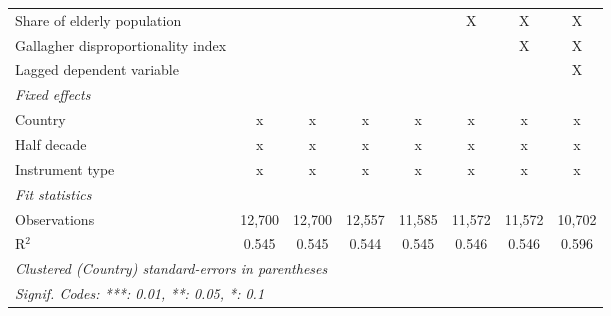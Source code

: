 \begin{tabular}{lccccccc}
   Share of elderly population                                       &                &               &                &                & X              & X              & X\\  
   Gallagher disproportionality index                                &                &               &                &                &                & X              & X\\  
   Lagged dependent variable                                         &                &               &                &                &                &                & X\\  
   \emph{Fixed effects}\\
   Country                                                           & x              & x             & x              & x              & x              & x              & x\\  
   Half decade                                                       & x              & x             & x              & x              & x              & x              & x\\  
   Instrument type                                                   & x              & x             & x              & x              & x              & x              & x\\  
   \midrule \emph{Fit statistics}\\
   Observations                                                      & 12,700         & 12,700        & 12,557         & 11,585         & 11,572         & 11,572         & 10,702\\  
   R$^2$                                                             & 0.545          & 0.545         & 0.544          & 0.545          & 0.546          & 0.546          & 0.596\\  
   \midrule
   \multicolumn{8}{l}{\emph{Clustered (Country) standard-errors in parentheses}}\\
   \multicolumn{8}{l}{\emph{Signif. Codes: ***: 0.01, **: 0.05, *: 0.1}}\\
\end{tabular}
\par\endgroup


